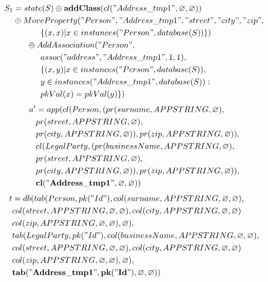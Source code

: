 \documentclass[11pt]{article}
\begin{document}
\newpage
\begin{align*}
S_1 &= state(S) \oplus \mathbf{addClass}(cl("Address\_tmp1", \varnothing, \varnothing)) \\
& \oplus MoveProperty("Person", "Address\_tmp1", "street", "city", "zip", \\
& \;\;\;\;\;\; \;\;\;\;\;\;    \{(x,x) | x \in instances("Person", database(S))\}) \\
& \;\;\;\;\;\; \oplus AddAssociation("Person", \\ 
& \;\;\;\;\;\;\;\;\;\;\;\; assoc("address", "Address\_tmp1", 1, 1),\\ 
& \;\;\;\;\;\;\;\;\;\;\;\; \{(x,y)| x \in instances("Person", database(S)), \\
& \;\;\;\;\;\; \;\;\;\;\;\; y \in instances("Address\_tmp1", database(S)) : \\ 
& \;\;\;\;\;\;\;\;\;\;\;\; pkVal(x) = pkVal(y) \})
\end{align*}
\hline
\begin{align*}
a' &= app(cl(Person, (pr(surname, APPSTRING, \varnothing), \\
& pr(street, APPSTRING, \varnothing), \\
& pr(city, APPSTRING, \varnothing)), pr(zip, APPSTRING, \varnothing)), \\
& cl(LegalParty, (pr(businessName, APPSTRING, \varnothing), \\
& pr(street, APPSTRING, \varnothing), \\
& pr(city, APPSTRING, \varnothing)), pr(zip, APPSTRING, \varnothing)),\\
& \mathbf{cl("Address\_tmp1", \varnothing, \varnothing)}
 )
\end{align*}
\begin{align*}
t &= db(tab(Person, pk("Id"), col(surname, APPSTRING, \varnothing, \varnothing), \\
& col(street, APPSTRING, \varnothing, \varnothing), col(city, APPSTRING, \varnothing, \varnothing) \\
& col(zip, APPSTRING, \varnothing, \varnothing), \varnothing), \\
& tab(LegalParty, pk("Id"),  col(businessName, APPSTRING, \varnothing, \varnothing), \\
& col(street, APPSTRING, \varnothing, \varnothing), col(city, APPSTRING, \varnothing, \varnothing) \\
& col(zip, APPSTRING, \varnothing, \varnothing), \varnothing), \\
& \mathbf{tab("Address\_tmp1", pk("Id"), \varnothing, \varnothing)}) 
\end{align*}
\end{document}

